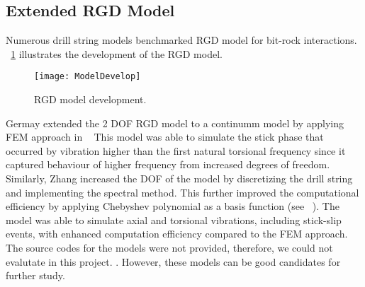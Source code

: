 \subsection{Extended RGD Model}
Numerous drill string models benchmarked RGD model for bit-rock interactions. \figurename~\ref{model_develop_figure} illustrates the development of the RGD model.
\begin{figure}
  \centering
  \texttt{[image: ModelDevelop]}
  \caption[RGD model development]{RGD model development.}\label{model_develop_figure}
\end{figure} 
Germay extended the 2 DOF RGD model to a continumm model by applying FEM approach in ~\cite{ref:germay2009a}  This model was able to simulate the stick  phase that occurred by vibration higher than the first natural torsional frequency since it captured behaviour of higher frequency from increased degrees of freedom. Similarly, Zhang increased the DOF of the model by discretizing the drill string and implementing the spectral method. This further improved the computational efficiency by applying Chebyshev polynomial as a basis function (see ~\cite{ref:zhang2020a}). The model was able to simulate axial and torsional vibrations, including stick-slip events, with enhanced computation efficiency compared to the FEM approach. The source codes for the models were not provided, therefore, we could not evalutate in this project. \resolvedcomment{}. However, these models can be good candidates for further study. 